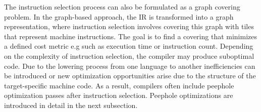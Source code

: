 The instruction selection process can also be formulated as a graph covering problem. In the graph-based approach, the IR is transformed into a graph representation, where instruction selection involves covering this graph with tiles that represent machine instructions. The goal is to find a covering that minimizes a defined cost metric e.g such as execution time or instruction count. 
Depending on the complexity of instruction selection, the compiler may produce suboptimal code. Due to the lowering process from one language to another inefficiencies can be introduced or new optimization opportunities arise due to the structure of the target-specific machine code. As a result, compilers often include peephole optimization passes after instruction selection. Peephole optimizations are introduced in detail in the next subsection.

